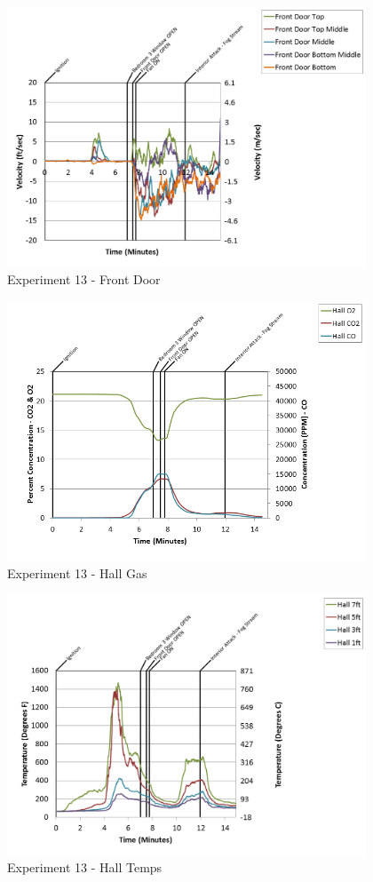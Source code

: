 \documentclass{article}
\begin{document}
\begin{appendices}
\begin{figure}[h!]
	\centering
	\includegraphics[height=3.05in]{0_Images/Results_Charts/Exp_13_Charts/FrontDoor.png}
	\caption{Experiment 13 - Front Door}
\end{figure}

\clearpage

\begin{figure}[h!]
	\centering
	\includegraphics[height=3.05in]{0_Images/Results_Charts/Exp_13_Charts/HallGas.png}
	\caption{Experiment 13 - Hall Gas}
\end{figure}


\begin{figure}[h!]
	\centering
	\includegraphics[height=3.05in]{0_Images/Results_Charts/Exp_13_Charts/HallTemps.png}
	\caption{Experiment 13 - Hall Temps}
\end{figure}


\end{appendices}
\end{document}
